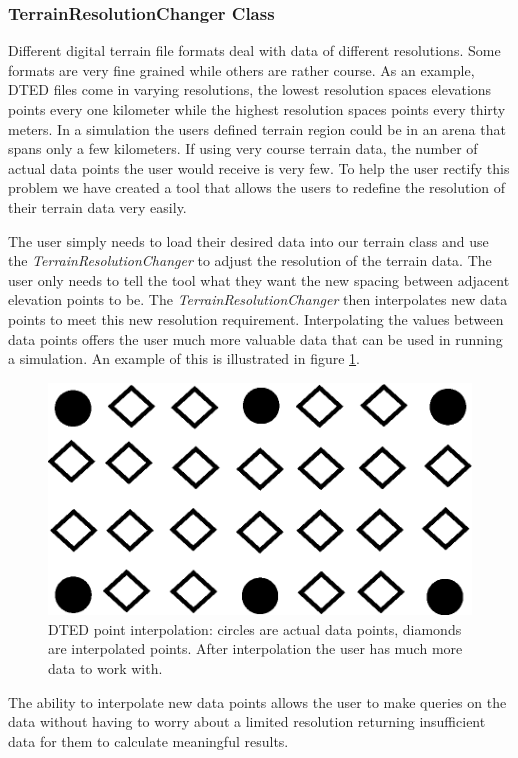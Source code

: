 \subsubsection{TerrainResolutionChanger Class}
Different digital terrain file formats deal with data of different resolutions.  Some formats are very fine grained while others are rather course.  As an example, DTED files come in varying resolutions, the lowest resolution spaces elevations points every one kilometer while the highest resolution spaces points every thirty meters.  In a simulation the users defined terrain region could be in an arena that spans only a few kilometers.  If using very course terrain data, the number of actual data points the user would receive is very few.  To help the user rectify this problem we have created a tool that allows the users to redefine the resolution of their terrain data very easily.

The user simply needs to load their desired data into our terrain class and use the \textit{TerrainResolutionChanger} to adjust the resolution of the terrain data.  The user only needs to tell the tool what they want the new spacing between adjacent elevation points to be.  The \textit{TerrainResolutionChanger} then interpolates new data points to meet this new resolution requirement.  Interpolating the values between data points offers the user much more valuable data that can be used in running a simulation.  An example of this is illustrated in figure \ref{fig:dted_interpolation}.

\begin{figure}[ht]
\centering
  \includegraphics[width = 0.5\linewidth]{images/network_vis/dted_interpolation.eps}
  \caption{DTED point interpolation: circles are actual data points, diamonds are interpolated points.  After interpolation the user has much more data to work with.}
\label{fig:dted_interpolation}
\end{figure}

The ability to interpolate new data points allows the user to make queries on the data without having to worry about a limited resolution returning insufficient data for them to calculate meaningful results.

